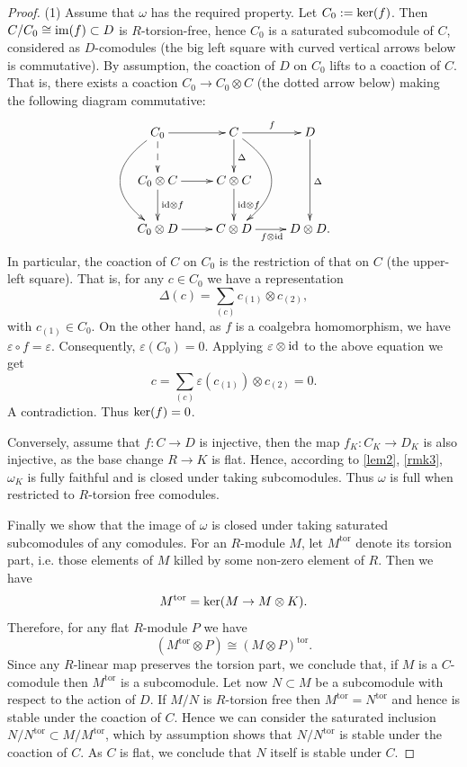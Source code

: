 \documentclass[12pt]{amsart}
\theoremstyle{plain}
\theoremstyle{definition}
\numberwithin{thm}{section}
\begin{document}
\begin{proof}
(1) Assume that $\omega$ has the required property. Let $C_0:={\rm ker}(f)$. 
Then $C/C_0\cong {\rm im}(f)\subset D$ is $R$-torsion-free, hence $C_0$ is a saturated subcomodule of $C$, considered as $D$-comodules (the big left square with curved vertical arrows below is commutative). 
By assumption, the coaction of $D$ on $C_0$ lifts to a coaction of $C$. That is, there exists a coaction $C_0\to C_0\otimes C$ (the dotted arrow below) making the following diagram commutative:
$$\xymatrix{
C_0\ar[r] \ar@{-->}[d]\ar@/_30pt/[dd]
&C\ar[d]^\Delta\ar[r]^f\ar@/^30pt/[dd]
& D\ar[dd]^\Delta \\
C_0\otimes C\ar[r]\ar[d]^{{\rm id}\otimes f}& C\otimes C\ar[d]^{{\rm id}\otimes f}&\\
C_0\otimes D\ar[r]&C\otimes D\ar[r]_{f\otimes {\rm id}}&D\otimes D.}$$
In particular, the coaction of $C$ on $C_0$ is the restriction of that on $C$ (the upper-left square).
That is, for any $c\in C_0$ we have a representation
$$\Delta(c)=\sum_{(c)}c_{(1)}\otimes c_{(2)},$$
with $c_{(1)}\in C_0$. On the other hand, as $f$ is a coalgebra homomorphism, we have $\varepsilon\circ f=\varepsilon$. Consequently, $\varepsilon(C_0)=0$. Applying $\varepsilon\otimes{\rm id}$ to the above equation we get
$$c=\sum_{(c)}\varepsilon(c_{(1)})\otimes c_{(2)}=0.$$
A contradiction. Thus ${\rm ker}(f)=0$.

Conversely, assume that $f:C\to D$ is injective, then the map $f_K:C_K\to D_K$ is also injective, as the base change $R\to K$ is flat. Hence, according to \ref{lem2}, \ref{rmk3}, $\omega_K$ is fully faithful and is closed under taking subcomodules. Thus $\omega$ is full when restricted to $R$-torsion free comodules. 

Finally we show that the image of $\omega$ is closed under taking saturated subcomodules of any comodules. For an $R$-module $M$, let $M^\text{tor}$ denote its torsion part, i.e. those elements of $M$ killed by some non-zero element of $R$. Then we have
$$M^\text{tor}={\rm ker}(M\to M\otimes K).$$
Therefore, for any flat $R$-module $P$ we have
$$(M^\text{tor}\otimes P)\cong (M\otimes P)^\text{tor}.$$
Since any $R$-linear map preserves the torsion part, we conclude that, if $M$ is a $C$-comodule then $M^\text{tor}$ is a subcomodule. 
Let now $N\subset M$ be a subcomodule with respect to the action of $D$. 
If $M/N$ is $R$-torsion free then $M^\text{tor}=N^\text{tor}$ and hence is stable under the coaction of $C$. 
Hence we can consider the saturated inclusion $N/N^\text{tor}\subset M/M^\text{tor}$, which by assumption shows that $N/N^\text{tor}$ is stable under the coaction of $C$. 
As $C$ is flat, we conclude that $N$ itself is stable under $C$.


\end{proof}
\end{document}
